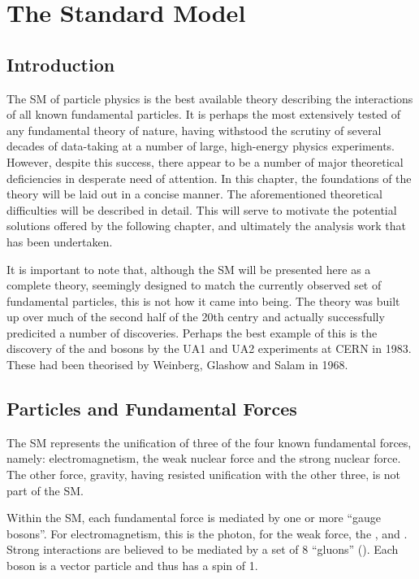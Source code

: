 \chapter{The Standard Model}
\label{sec:sm}
\section{Introduction}
The \acl{SM} of particle physics is the best available theory describing the
interactions of all known fundamental particles. It is perhaps the most
extensively tested of any fundamental theory of nature, having withstood the
scrutiny of several decades of data-taking at a number of large, high-energy
physics experiments. However, despite this success, there appear to be a number
of major theoretical deficiencies in desperate need of attention. In this
chapter, the foundations of the theory will be laid out in a concise manner. The
aforementioned theoretical difficulties will be described in detail. This will
serve to motivate the potential solutions offered by the following chapter, and
ultimately the analysis work that has been undertaken.

It is important to note that, although the \ac{SM} will be presented here as a
complete theory, seemingly designed to match the currently observed set of
fundamental particles, this is not how it came into being. The theory was built
up over much of the second half of the 20th centry and actually successfully
predicited a number of discoveries. Perhaps the best example of this is the
discovery of the \PW and \PZ bosons by the \ac{UA1} and \ac{UA2} experiments at
\ac{CERN} in 1983. These had been theorised by Weinberg, Glashow and Salam in
1968.

\section{Particles and Fundamental Forces}
\label{sec:theory:particles}
The \ac{SM} represents the unification of three of the four known fundamental
forces, namely: electromagnetism, the weak nuclear force and the strong nuclear
force. The other force, gravity, having resisted unification with the other
three, is not part of the \ac{SM}.

Within the \ac{SM}, each fundamental force is mediated by one or more ``gauge
bosons''. For electromagnetism, this is the photon, for the weak force, the
\PWp, \PWm and \PZ. Strong interactions are believed to be mediated by a set of
8 ``gluons'' (\Pg). Each boson is a vector particle and thus has a spin of 1.

